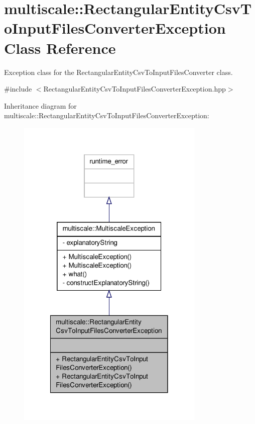\hypertarget{classmultiscale_1_1RectangularEntityCsvToInputFilesConverterException}{\section{multiscale\-:\-:Rectangular\-Entity\-Csv\-To\-Input\-Files\-Converter\-Exception Class Reference}
\label{classmultiscale_1_1RectangularEntityCsvToInputFilesConverterException}
}


Exception class for the Rectangular\-Entity\-Csv\-To\-Input\-Files\-Converter class.  




{\ttfamily \#include $<$Rectangular\-Entity\-Csv\-To\-Input\-Files\-Converter\-Exception.\-hpp$>$}



Inheritance diagram for multiscale\-:\-:Rectangular\-Entity\-Csv\-To\-Input\-Files\-Converter\-Exception\-:
\nopagebreak
\begin{figure}[H]
\begin{center}
\leavevmode
\includegraphics[width=254pt]{classmultiscale_1_1RectangularEntityCsvToInputFilesConverterException__inherit__graph}
\end{center}
\end{figure}



